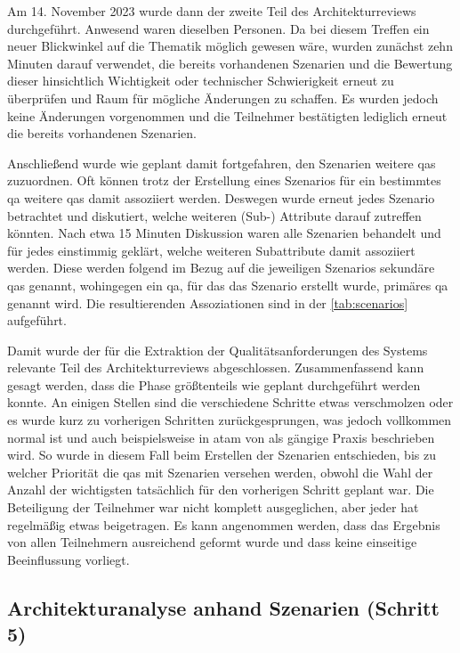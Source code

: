 Am 14. November 2023 wurde dann der zweite Teil des Architekturreviews durchgeführt.
Anwesend waren dieselben Personen.
Da bei diesem Treffen ein neuer Blickwinkel auf die Thematik möglich gewesen wäre, wurden zunächst zehn Minuten darauf verwendet, die bereits vorhandenen Szenarien und die Bewertung dieser hinsichtlich Wichtigkeit oder technischer Schwierigkeit erneut zu überprüfen und Raum für mögliche Änderungen zu schaffen.
Es wurden jedoch keine Änderungen vorgenommen und die Teilnehmer bestätigten lediglich erneut die bereits vorhandenen Szenarien.

Anschließend wurde wie geplant damit fortgefahren, den Szenarien weitere \glspl{qa} zuzuordnen.
Oft können trotz der Erstellung eines Szenarios für ein bestimmtes \gls{qa} weitere \glspl{qa} damit assoziiert werden.
Deswegen wurde erneut jedes Szenario betrachtet und diskutiert, welche weiteren (Sub-) Attribute darauf zutreffen könnten.
Nach etwa 15 Minuten Diskussion waren alle Szenarien behandelt und für jedes einstimmig geklärt, welche weiteren Subattribute damit assoziiert werden.
Diese werden folgend im Bezug auf die jeweiligen Szenarios sekundäre \glspl{qa} genannt, wohingegen ein \gls{qa}, für das das Szenario erstellt wurde, primäres \gls{qa} genannt wird.
Die resultierenden Assoziationen sind in der \cref{tab:scenarios} aufgeführt.



Damit wurde der für die Extraktion der Qualitätsanforderungen des Systems relevante Teil des Architekturreviews abgeschlossen.
Zusammenfassend kann gesagt werden, dass die Phase größtenteils wie geplant durchgeführt werden konnte.
An einigen Stellen sind die verschiedene Schritte etwas verschmolzen oder es wurde kurz zu vorherigen Schritten zurückgesprungen, was jedoch vollkommen normal ist und auch beispielsweise in \gls{atam} von  als gängige Praxis beschrieben wird.
So wurde in diesem Fall beim Erstellen der Szenarien entschieden, bis zu welcher Priorität die \glspl{qa} mit Szenarien versehen werden, obwohl die Wahl der Anzahl der wichtigsten tatsächlich für den vorherigen Schritt geplant war.
Die Beteiligung der Teilnehmer war nicht komplett ausgeglichen, aber jeder hat regelmäßig etwas beigetragen.
Es kann angenommen werden, dass das Ergebnis von allen Teilnehmern ausreichend geformt wurde und dass keine einseitige Beeinflussung vorliegt.

\subsection{Architekturanalyse anhand Szenarien (Schritt 5)}

